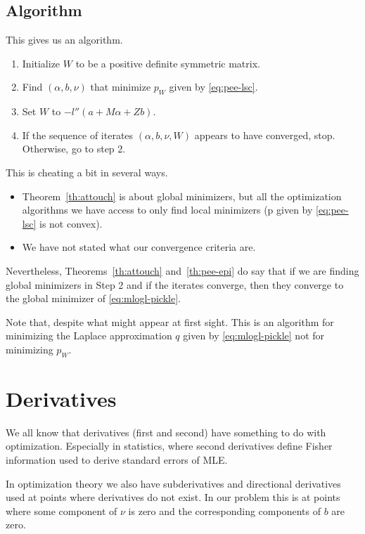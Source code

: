 \subsection{Algorithm}

This gives us an algorithm.
\begin{enumerate}
\item Initialize $W$ to be a positive definite symmetric matrix.
\item Find $(\alpha, b, \nu)$ that minimize $p_W$ given by \eqref{eq:pee-lsc}.
\item Set $W$ to $- l''(a + M \alpha + Z b)$.
\item If the sequence of iterates $(\alpha, b, \nu, W)$ appears
    to have converged, stop.  Otherwise, go to step 2.
\end{enumerate}

This is cheating a bit in several ways.
\begin{itemize}
\item Theorem~\ref{th:attouch} is about global minimizers, but all the
    optimization algorithms we have access to only find local minimizers
    (p given by \eqref{eq:pee-lsc} is not convex).
\item We have not stated what our convergence criteria are.
\end{itemize}

Nevertheless, Theorems~\ref{th:attouch} and~\ref{th:pee-epi} do say
that if we are finding global minimizers in Step 2 and if the iterates
converge, then they converge to the global minimizer of
\eqref{eq:mlogl-pickle}.

Note that, despite what might appear at first sight.  This is an algorithm
for minimizing the Laplace approximation $q$ given by \eqref{eq:mlogl-pickle}
not for minimizing $p_W$.

\section{Derivatives}

We all know that derivatives (first and second) have something to do with
optimization.  Especially in statistics, where second derivatives define
Fisher information used to derive standard errors of MLE.

In optimization theory we also have subderivatives and directional derivatives
used at points where derivatives do not exist.  In our problem this is
at points where some component of $\nu$ is zero and the corresponding
components of $b$ are zero.

